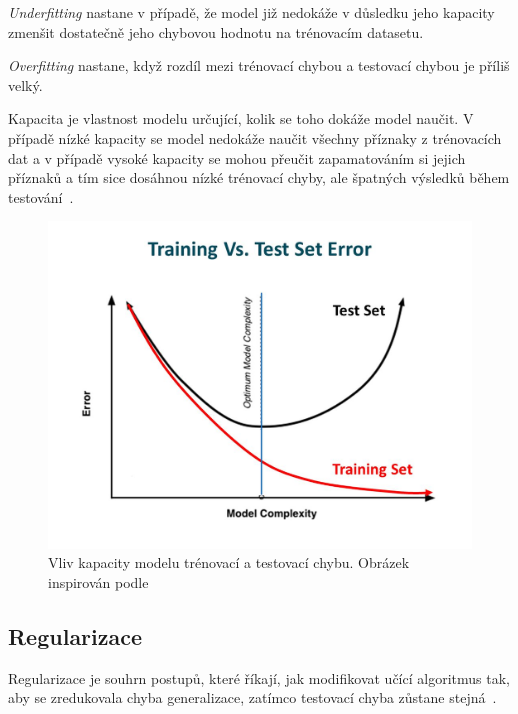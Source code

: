 \textit{Underfitting} nastane v případě, že model již nedokáže v důsledku jeho kapacity zmenšit dostatečně jeho chybovou hodnotu na trénovacím datasetu.

\textit{Overfitting} nastane, když rozdíl mezi trénovací chybou a testovací chybou je příliš velký.

Kapacita je vlastnost modelu určující, kolik se toho dokáže model naučit. V případě nízké kapacity se model nedokáže naučit všechny příznaky z trénovacích dat a v případě vysoké kapacity se mohou přeučit zapamatováním si jejich příznaků a tím sice dosáhnou nízké trénovací chyby, ale špatných výsledků během testování~\cite[p107]{mitdeeplearning}.
\begin{figure}[H]
    \centering
    \includegraphics[scale=0.3]{obrazky-figures/capacity_vs_error.jpg}
    \caption{\label{fig:gradientdescent}Vliv kapacity modelu trénovací a testovací chybu. Obrázek inspirován podle~\cite{trainingvstesterror}}
\end{figure}


\subsection{Regularizace}
Regularizace je souhrn postupů, které říkají, jak modifikovat učící algoritmus tak, aby se zredukovala chyba generalizace, zatímco testovací chyba zůstane stejná~\cite[p117]{mitdeeplearning}.


